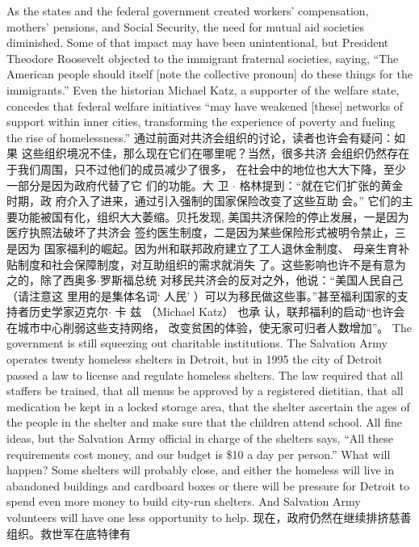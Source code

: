 \begin{paracol}{2}
As the states and the federal government created workers' compensation, mothers' pensions, and Social Security, the need for
mutual aid societies diminished. Some of that impact may have
been unintentional, but President Theodore Roosevelt objected to the immigrant fraternal societies, saying, ``The American
people should itself [note the collective pronoun] do these
things for the immigrants.'' Even the historian Michael Katz, a
supporter of the welfare state, concedes that federal welfare initiatives ``may have weakened [these] networks of support
within inner cities, transforming the experience of poverty and
fueling the rise of homelessness.''
\switchcolumn
通过前面对共济会组织的讨论，读者也许会有疑问：如果
这些组织境况不佳，那么现在它们在哪里呢？当然，很多共济
会组织仍然存在于我们周围，只不过他们的成员减少了很多，
在社会中的地位也大大下降，至少一部分是因为政府代替了它
们的功能。大 卫 $\cdot$ 格林提到：“就在它们扩张的黄金时期，政
府介入了进来，通过引入强制的国家保险改变了这些互助
会。” 它们的主要功能被国有化，组织大大萎缩。贝托发现,
美国共济保险的停止发展，一是因为医疗执照法破坏了共济会
签约医生制度，二是因为某些保险形式被明令禁止，三是因为
国家福利的崛起。因为州和联邦政府建立了工人退休金制度、
母亲生育补贴制度和社会保障制度，对互助组织的需求就消失
了。这些影响也许不是有意为之的，除了西奥多$\cdot$罗斯福总统
对移民共济会的反对之外，他说：“美国人民自己（请注意这
里用的是集体名词‘ 人民’ ）可以为移民做这些事。”甚至福利国家的支持者历史学家迈克尔$\cdot$ 卡 兹 （Michael Katz） 也承
认，联邦福利的启动“也许会在城市中心削弱这些支持网络，
改变贫困的体验，使无家可归者人数增加”。
\switchcolumn*
The government is still squeezing out charitable institutions.
The Salvation Army operates twenty homeless shelters in Detroit, but in 1995 the city of Detroit passed a law to license and
regulate homeless shelters. The law required that all staffers be
trained, that all menus be approved by a registered dietitian,
that all medication be kept in a locked storage area, that the
shelter ascertain the ages of the people in the shelter and make
sure that the children attend school. All fine ideas, but the Salvation Army official in charge of the shelters says, ``All these requirements cost money, and our budget is \$10 a day per
person.'' What will happen? Some shelters will probably close,
and either the homeless will live in abandoned buildings and
cardboard boxes or there will be pressure for Detroit to spend
even more money to build city-run shelters. And Salvation
Army volunteers will have one less opportunity to help.
\switchcolumn
现在，政府仍然在继续排挤慈善组织。救世军在底特律有

\end{paracol}
